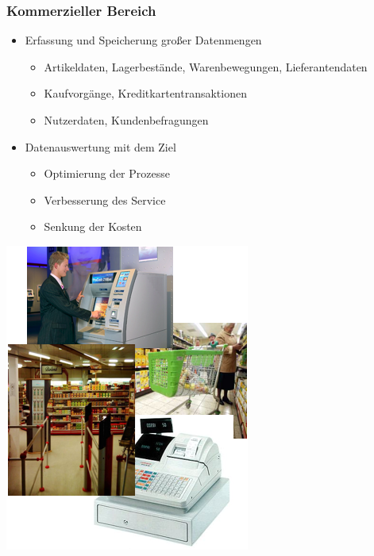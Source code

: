 \begin{frame}
\frametitle{Kommerzieller Bereich}

\begin{minipage}[c]{7cm}
\begin{itemize}
\item Erfassung und Speicherung großer Datenmengen
\begin{itemize}
\item Artikeldaten, Lagerbestände, Warenbewegungen, Lieferantendaten
\item Kaufvorgänge, Kreditkartentransaktionen
\item Nutzerdaten, Kundenbefragungen
\end{itemize}
\item Datenauswertung mit dem Ziel
\begin{itemize}
\item Optimierung der Prozesse
\item Verbesserung des Service
\item Senkung der Kosten
\end{itemize}
\end{itemize}
\end{minipage}\quad
\begin{minipage}[c]{3cm}
\includegraphics[scale=.3]{fig1/kommerz-anwendung.png}
\end{minipage}

\end{frame}


